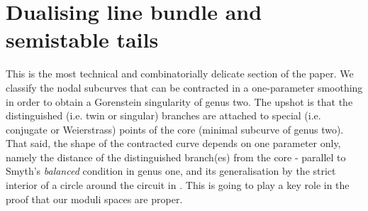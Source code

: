 \documentclass[11pt]{amsart}
\theoremstyle{plain}
\theoremstyle{definition}
\begin{document}
\section{Dualising line bundle and semistable tails}
This is the most technical and combinatorially delicate section of the paper. We classify the nodal subcurves that can be contracted in a one-parameter smoothing in order to obtain a Gorenstein singularity of genus two. The upshot is that the distinguished (i.e. twin or singular) branches are attached to special (i.e. conjugate or Weierstrass) points of the core (minimal subcurve of genus two). That said, the shape of the contracted curve depends on one parameter only, namely the distance of the distinguished branch(es) from the core - parallel to Smyth's \emph{balanced} condition \cite[Definition 2.11]{SMY1} in genus one, and its generalisation by the strict interior of a circle around the circuit in \cite{RSPW1}. This is going to play a key role in the proof that our moduli spaces are proper.
\end{document}
